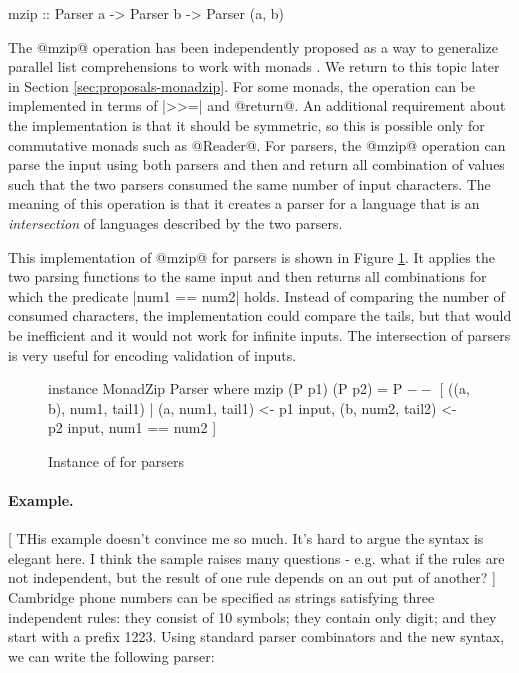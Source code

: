 \documentclass[preprint]{sigplanconf}
\begin{document}
\begin{code}
mzip :: Parser a -> Parser b -> Parser (a, b)
\end{code}
The @mzip@ operation has been independently proposed as a way to generalize parallel list 
comprehensions to work with monads \cite{bringbackmc}. We return to this topic later in Section 
\ref{sec:proposals-monadzip}. For some monads, the operation can be implemented in terms of |>>=| 
and @return@. An additional requirement about the implementation is that it should be symmetric, 
so this is possible only for commutative monads such as @Reader@. For parsers, the @mzip@ operation 
can parse the input using both parsers and then and return all combination of values such that the 
two parsers consumed the same number of input characters. The meaning of this operation is that it 
creates a parser for a language that is an \textit{intersection} of languages described by the 
two parsers.

This implementation of @mzip@ for parsers is shown in Figure \ref{fig:parser-monadzip}. It
applies the two parsing functions to the same input and then returns all combinations for which
the predicate |num1 == num2| holds. Instead of comparing the number of consumed characters, the 
implementation could compare the tails, but that would be inefficient and it would not work for
infinite inputs. The intersection of parsers is very useful for encoding validation of 
inputs.

\begin{figure}
\label{fig:parser-monadzip}
\begin{code}
instance MonadZip Parser where 
  mzip (P p1) (P p2) = P $  --$
    [ ((a, b), num1, tail1) |
         (a, num1, tail1) <- p1 input,
         (b, num2, tail2) <- p2 input, num1 == num2 ]
\end{code}
\caption{Instance of  for parsers}
\end{figure}

\paragraph{Example.}
[ THis example doesn't convince me so much. It's hard to argue the syntax is elegant here. I think the sample
raises many questions - e.g. what if the rules are not independent, but the result of one rule depends on an 
out put of another?  ]
Cambridge phone numbers can be specified as strings satisfying three independent rules: 
they consist of 10 symbols; they contain only digit;  and they start with 
a prefix 1223. Using standard parser combinators and the new syntax, we can write the 
following parser:
\end{document}
